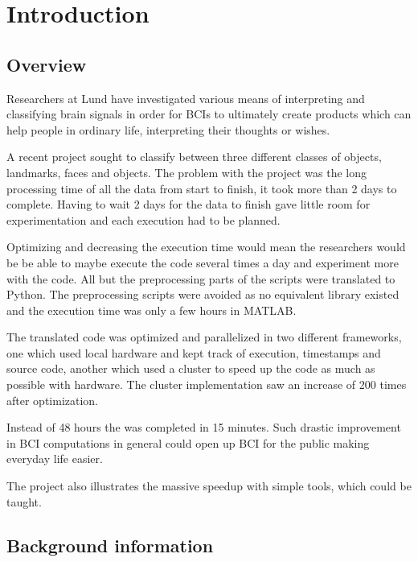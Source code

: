\documentclass[12pt, a4paper]{article}
\begin{document}
\glsaddall
\printglossary[type=main,style=long,nonumberlist]

\newpage

\section{Introduction}

\subsection{Overview}
Researchers at Lund have investigated various means of interpreting and classifying brain signals in order for BCIs to ultimately create products which can help people in ordinary life, interpreting their thoughts or wishes.

A recent project sought to classify between three different classes of objects, landmarks, faces and objects.
The problem with the project was the long processing time of all the data from start to finish, it took more than 2 days to complete.
Having to wait 2 days for the data to finish gave little room for experimentation and each execution had to be planned.

Optimizing and decreasing the execution time would mean the researchers would be be able to maybe execute the code several times a day and experiment more with the code.
All but the preprocessing parts of the scripts were translated to Python.
The preprocessing scripts were avoided as no equivalent library existed and the execution time was only a few hours in MATLAB.

The translated code was optimized and parallelized in two different frameworks, one which used local hardware and kept track of execution, timestamps and source code, another which used a cluster to speed up the code as much as possible with hardware.
The cluster implementation saw an increase of 200 times after optimization.

Instead of 48 hours the was completed in 15 minutes.
Such drastic improvement in BCI computations in general could open up BCI for the public making everyday life easier.

The project also illustrates the massive speedup with simple tools, which could be taught.


\subsection{Background information}
\end{document}
